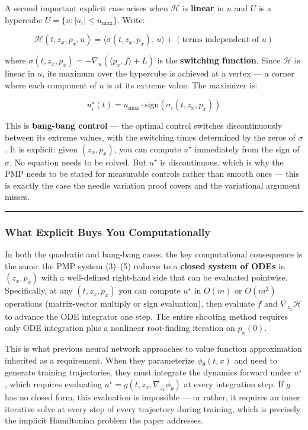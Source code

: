 \documentclass{article}
\begin{document}
\begin{examplebox}
A second important explicit case arises when $\mathcal{H}$ is \textbf{linear} in $u$ and $U$ is a hypercube $U = \{u : |u_i| \leq u_{\max}\}$. Write:

$$\mathcal{H}(t, z_x, p_x, u) = \langle \sigma(t, z_x, p_x),\, u \rangle + (\text{terms independent of } u)$$

where $\sigma(t, z_x, p_x) = -\nabla_u(\langle p_x, f\rangle + L)$ is the \textbf{switching function}. Since $\mathcal{H}$ is linear in $u$, its maximum over the hypercube is achieved at a vertex — a corner where each component of $u$ is at its extreme value. The maximizer is:

$$u^\star_i(t) = u_{\max} \cdot \text{sign}(\sigma_i(t, z_x, p_x))$$

This is \textbf{bang-bang control} — the optimal control switches discontinuously between its extreme values, with the switching times determined by the zeros of $\sigma$. It is explicit: given $(z_x, p_x)$, you can compute $u^\star$ immediately from the sign of $\sigma$. No equation needs to be solved. But $u^\star$ is discontinuous, which is why the PMP needs to be stated for measurable controls rather than smooth ones — this is exactly the case the needle variation proof covers and the variational argument misses.
\end{examplebox}

\medskip\hrule\medskip

\subsubsection{What Explicit Buys You Computationally}

\begin{tldrbox}
In both the quadratic and bang-bang cases, the key computational consequence is the same: the PMP system (3)–(5) reduces to a \textbf{closed system of ODEs} in $(z_x, p_x)$ with a well-defined right-hand side that can be evaluated pointwise. Specifically, at any $(t, z_x, p_x)$ you can compute $u^\star$ in $O(m)$ or $O(m^2)$ operations (matrix-vector multiply or sign evaluation), then evaluate $f$ and $\nabla_{z_x}\mathcal{H}$ to advance the ODE integrator one step. The entire shooting method requires only ODE integration plus a nonlinear root-finding iteration on $p_x(0)$.

This is what previous neural network approaches to value function approximation inherited as a requirement. When they parameterize $\phi_\theta(t, x)$ and need to generate training trajectories, they must integrate the dynamics forward under $u^\star$, which requires evaluating $u^\star = g(t, z_x, \nabla_{z_x}\phi_\theta)$ at every integration step. If $g$ has no closed form, this evaluation is impossible — or rather, it requires an inner iterative solve at every step of every trajectory during training, which is precisely the implicit Hamiltonian problem the paper addresses.
\end{tldrbox}
\end{document}
